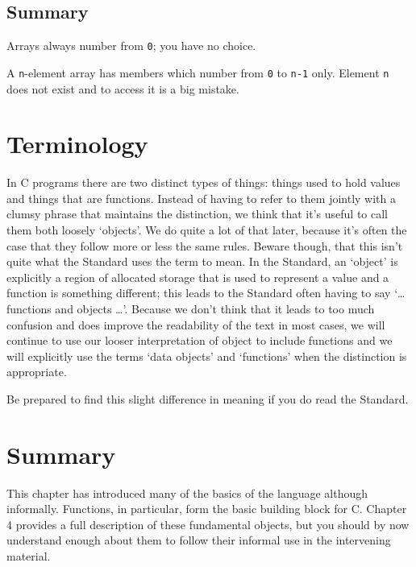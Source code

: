   

  \subsection{Summary}
   Arrays always number from \texttt{0}; you have no choice.

   A \texttt{n}-element array has members which number from
    \texttt{0} to \texttt{n-1} only.  Element \texttt{n} does not
    exist and to access it is a big mistake.

  

 
        \section{Terminology}
        

  

  In C programs there are two distinct types of things: things used to hold
   values and things that are functions. Instead of having to refer to them
   jointly with a clumsy phrase that maintains the distinction, we think that
   it's useful to call them both loosely `objects'. We do quite a lot of
   that later, because it's often the case that they follow more or less the
   same rules. Beware though, that this isn't quite what the Standard uses the
   term to mean. In the Standard, an `object' is explicitly a region of
   allocated storage that is used to represent a value and a function is
   something different; this leads to the Standard often having to say
   `\ldots  functions and objects \ldots '. Because we don't think
   that it leads to too much confusion and does improve the readability of the
   text in most cases, we will continue to use our looser interpretation of
   object to include functions and we will explicitly use the terms `data
   objects' and `functions' when the distinction is appropriate.


  Be prepared to find this slight difference in meaning if you do read the
   Standard.


 
        \section{Summary}
        


  This chapter has introduced many of the basics of the language although
   informally. Functions, in particular, form the basic building block for C.
   Chapter 4 provides a full description of these fundamental
   objects, but you should by now understand enough about them to follow their
   informal use in the intervening material.


